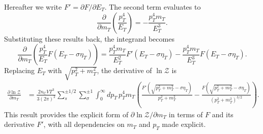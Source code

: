 \documentclass[epjST]{svjour}
\begin{document}
Hereafter we write \(F'=\partial F/\partial E_{T}\). The second term evaluates to
\begin{equation}
\frac{\partial}{\partial m_{T}} \left( \frac{p_{T}^{4}}{E_{T}} \right) = -\frac{p_{T}^{4} m_{T}}{E_{T}^{3}}.
\end{equation}
Substituting these results back, the integrand becomes
\begin{equation}
\frac{\partial}{\partial m_{T}} \left( \frac{p_{T}^{4}}{E_{T}} F(E_{T} - \sigma\eta_{T}) \right) = \frac{p_{T}^{4} m_{T}}{E_{T}^{2}} F'(E_{T} - \sigma\eta_{T}) - \frac{p_{T}^{4} m_{T}}{E_{T}^{3}} F(E_{T} - \sigma\eta_{T}).
\end{equation}
Replacing \(E_{T}\) with \(\sqrt{p_{T}^{2} + m_{T}^{2}}\), the derivative of \(\ln \mathcal{Z}\) is
\begin{align}
\frac{\partial \ln \mathcal{Z}}{\partial m_{T}} &= \frac{2 n_\mathrm{C} V T^{3}}{3 (2\pi)^{2}} \sum_{s}^{\pm1/2}\sum_{\sigma}^{\pm1} \int_{0}^{\infty} dp_{T} \, p_{T}^{4} m_{T}
\left( \frac{F'\left( \sqrt{p_{T}^{2} + m_{T}^{2}} - \sigma\eta_{T} \right)}{p_{T}^{2} + m_{T}^{2}} - \frac{F\left( \sqrt{p_{T}^{2} + m_{T}^{2}} - \sigma\eta_{T} \right)}{(p_{T}^{2} + m_{T}^{2})^{3/2}} \right).
\end{align}
This result provides the explicit form of \(\partial \ln \mathcal{Z}/\partial m_{T}\) in terms of \(F\) and its derivative \(F'\), with all dependencies on \(m_{T}\) and \(p_{T}\) made explicit.
\end{document}
